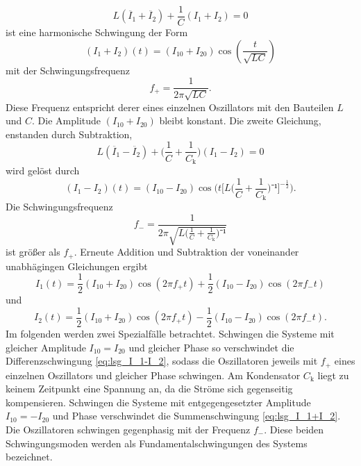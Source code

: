 \begin{equation}
	L(\ddot{I_1}+\ddot{I_2})+\frac{1}{C}({I_1}+{I_2})=0
	\label{eq:I_1+I_2}
\end{equation}
ist eine harmonische Schwingung der Form
\begin{equation}
	({I_1}+{I_2})(t)=({I_{10}}+{I_{20}})\cos(\frac{t}{\sqrt{LC}})
\end{equation}
mit der Schwingungsfrequenz 
\begin{equation}
f_+=\frac{1}{2\pi\sqrt{LC}}.
\label{eq:f_+}
\end{equation}
Diese Frequenz entspricht derer eines einzelnen Oszillators mit den Bauteilen $L$ und $C$.
 Die Amplitude $({I_10}+{I_20})$ bleibt konstant.
Die zweite Gleichung, enstanden durch Subtraktion,
\begin{equation}
	L(\ddot{I_1}-\ddot{I_2})+\bigl(\frac{1}{C}+\frac{1}{C_\mathup{k}}\bigr)({I_1}-{I_2})=0
	\label{eq:I_1-I_2}
\end{equation}
wird gelöst durch
\begin{equation}
	({I_1}-{I_2})(t)=({I_{10}}-{I_{20}})\cos\biggl(t{\biggl[L\biggl({\frac{1}{C}+\frac{1}{C_\mathup{k}}}\biggr)⁻¹\biggr]^{-\frac{1}{2}}}\biggr).
\end{equation}
Die Schwingungsfrequenz 
\begin{equation}
f_-=\frac{1}{2\pi\sqrt{L\bigl({\frac{1}{C}+\frac{1}{C_\mathup{k}}}\bigr)⁻¹}}
\label{eq:f_-}
\end{equation}
 ist größer als $f_+$.
Erneute Addition und Subtraktion der voneinander unabhägingen Gleichungen ergibt
\begin{equation}
	I_1(t)=\frac{1}{2}({I_{10}}+{I_{20}})\cos(2\pi f_+t)+\frac{1}{2}({I_{10}}-{I_{20}})\cos(2\pi f_-t)
	\label{eq:I_1_ur}
\end{equation}
und
\begin{equation}
	I_2(t)=\frac{1}{2}({I_{10}}+{I_{20}})\cos(2\pi f_+ t)-\frac{1}{2}({I_{10}}-{I_{20}})\cos(2\pi f_- t).
	\label{eq:I_2_ur}
\end{equation}
Im folgenden werden zwei Spezialfälle betrachtet. 
Schwingen die Systeme mit gleicher Amplitude $I_{10}=I_{20}$ und gleicher Phase so verschwindet die Differenzschwingung \eqref{eq:lsg_I_1-I_2}, sodass die Oszillatoren jeweils mit $f_+$ eines einzelnen Oszillators und gleicher Phase schwingen.
 Am Kondensator $C_\mathup{k}$ liegt zu keinem Zeitpunkt eine Spannung an, da die Ströme sich gegenseitig kompensieren.
Schwingen die Systeme mit entgegengesetzter Amplitude  $I_{10}=-I_{20}$ und Phase verschwindet die Summenschwingung \eqref{eq:lsg_I_1+I_2}. Die Oszillatoren schwingen gegenphasig mit der Frequenz $f_-$.
Diese beiden Schwingungsmoden werden als Fundamentalschwingungen des Systems bezeichnet.

